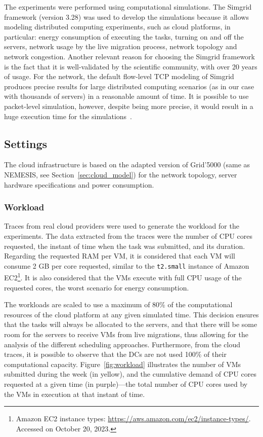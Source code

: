 The experiments were performed using computational simulations. The Simgrid~\cite{CASANOVA20142899} framework (version 3.28) was used to develop the simulations because it allows modeling distributed computing experiments, such as cloud platforms, in particular: energy consumption of executing the tasks, turning on and off the servers, network usage by the live migration process, network topology and network congestion. Another relevant reason for choosing the Simgrid framework is the fact that it is well-validated by the scientific community, with over 20 years of usage. For the network, the default flow-level TCP modeling of Simgrid produces precise results for large distributed computing scenarios (as in our case with thousands of servers) in a reasonable amount of time. It is possible to use packet-level simulation, however, despite being more precise, it would result in a huge execution time for the simulations~\cite{velho2013simgridparameters}. 



\subsection{Settings}

\label{sec:settings_smartgreens}

The cloud infrastructure is based on the adapted version of Grid'5000 (same as NEMESIS, see Section~\ref{sec:cloud_model}) for the network topology,  server hardware specifications and power consumption.

\subsubsection{Workload}

Traces from real cloud providers were used to generate the workload for the experiments. The data extracted from the traces were the number of CPU cores requested, the instant of time when the task was submitted, and its duration. Regarding the requested RAM per VM, it is considered that each VM will consume 2 GB per core requested, similar to the \texttt{t2.small} instance of Amazon EC2\footnote{Amazon EC2 instance types: \url{https://aws.amazon.com/ec2/instance-types/}. Accessed on October 20, 2023.}. It is also considered that the VMs execute with full CPU usage of the requested cores, the worst scenario for energy consumption. 

The workloads are scaled to use a maximum of 80\% of the computational resources of the cloud platform at any given simulated time. This decision ensures that the tasks will always be allocated to the servers, and that there will be some room for the servers to receive VMs from live migrations, thus allowing for the analysis of the different scheduling approaches. Furthermore, from the cloud traces, it is possible to observe that the DCs are not used 100\% of their computational capacity. Figure~\ref{fig:workload} illustrates the number of VMs submitted during the week (in yellow), and the cumulative demand of CPU cores requested at a given time (in purple)---the total number of CPU cores used by the VMs in execution at that instant of time.

